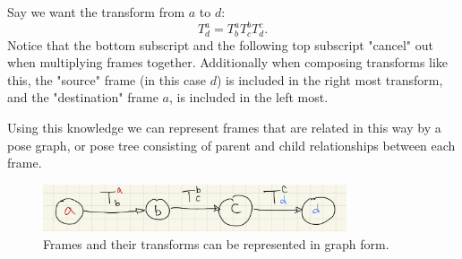 Say we want the transform from $a$ to $d$:
\begin{equation}
	T_d^a = T^a_b T^b_c T^c_d.
\end{equation}
Notice that the bottom subscript and the following top subscript "cancel" out when multiplying frames together. 
Additionally when composing transforms like this, the "source" frame (in this case $d$) is included in the right most transform, and the "destination" frame $a$, is included in the left most. 

Using this knowledge we can represent frames that are related in this way by a pose graph, or pose tree consisting of parent and child relationships between each frame. 

\begin{figure}[H]
	\centering
	\includegraphics[width=0.8\textwidth]{images/pose_graph.png}
	\caption{Frames and their transforms can be represented in graph form.}
	\label{fig: poses}
\end{figure}